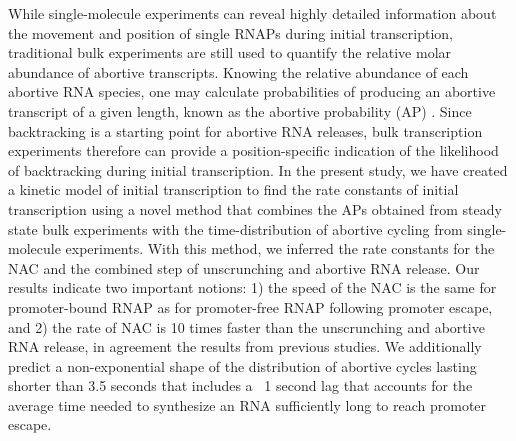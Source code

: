 While single-molecule experiments can reveal highly detailed information
about the movement and position of single RNAPs during initial transcription,
traditional bulk experiments are still used to quantify the relative molar
abundance of abortive transcripts. Knowing the relative abundance of each
abortive RNA species, one may calculate probabilities of producing an
abortive transcript of a given length, known as the abortive probability
(AP) \cite{hsu_promoter_2002, hsu_quantitative_1996}. Since backtracking is a
starting point for abortive RNA releases, bulk transcription experiments
therefore can provide a position-specific indication of the likelihood of
backtracking during initial transcription. In the present study, we have
created a kinetic model of initial transcription to find the rate constants of
initial transcription using a novel method that combines the APs obtained from
steady state bulk experiments with the time-distribution of abortive cycling
from single-molecule experiments. With this method, we inferred the rate
constants for the NAC and the combined step of unscrunching and abortive RNA
release.  Our results indicate two important notions: 1) the speed of the NAC
is the same for promoter-bound RNAP as for promoter-free RNAP following
promoter escape, and 2) the rate of NAC is 10 times faster than the
unscrunching and abortive RNA release, in agreement the results from previous
studies. We additionally predict a non-exponential shape of the distribution of
abortive cycles lasting shorter than 3.5 seconds that includes a ~1 second lag
that accounts for the average time needed to synthesize an RNA sufficiently
long to reach promoter escape.
